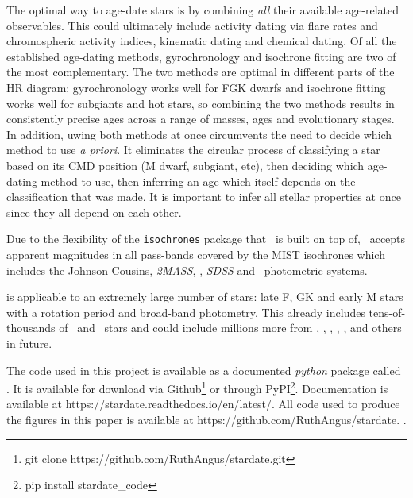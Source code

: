 The optimal way to age-date stars is by combining {\it all} their available
age-related observables.
This could ultimately include activity dating via flare rates and
chromospheric activity indices, kinematic dating and chemical dating.
Of all the established age-dating methods, gyrochronology and isochrone
fitting are two of the most complementary.
The two methods are optimal in different parts of the HR diagram:
gyrochronology works well for FGK dwarfs and isochrone fitting works well for
subgiants and hot stars, so combining the two methods results in consistently
precise ages across a range of masses, ages and evolutionary stages.
In addition, uwing both methods at once circumvents the need to decide which
method to use {\it a priori}.
It eliminates the circular process of classifying a star based on its CMD
position (M dwarf, subgiant, etc), then deciding which age-dating method to
use, then inferring an age which itself depends on the classification that was
made.
It is important to infer all stellar properties at once since they all depend
on each other.

Due to the flexibility of the {\tt isochrones} package that \sd\ is built on
top of, \sd\ accepts apparent magnitudes in all pass-bands covered by the MIST
isochrones which includes the Johnson-Cousins, {\it 2MASS}, \Kepler, {\it
SDSS} and \Gaia\ photometric systems.

\sd is applicable to an extremely large number of stars: late F, GK and early
M stars with a rotation period and broad-band photometry.
This already includes tens-of-thousands of \kepler\ and \ktwo\ stars and could
include millions more from \tess, \lsst, \wfirst, \plato, \gaia, and others in
future.

The code used in this project is available as a documented {\it python}
package called \sd.
It is available for download via Github\footnote{git clone
https://github.com/RuthAngus/stardate.git} or through
PyPI\footnote{pip install stardate\_code}.
Documentation is available at https://stardate.readthedocs.io/en/latest/.
All code used to produce the figures in this paper is available at
https://github.com/RuthAngus/stardate.
.

